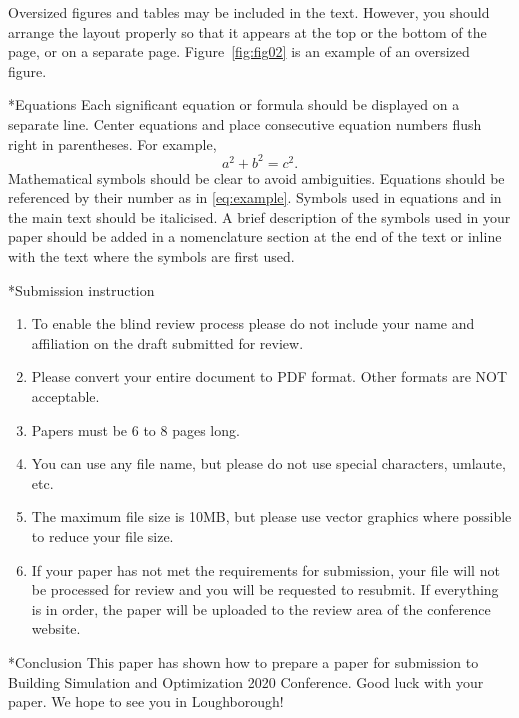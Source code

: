 \documentclass[twocolumn, a4paper,10pt]{article}
\makeatletter
\renewcommand\section{\@startsection{section}{1}{\z@}{0.25cm}{0.1cm}{\normalfont\large\bfseries}}
\renewcommand\subsection{\@startsection{subsection}{1}{\z@}{0.2cm}{0.1cm}{\normalfont\normalsize\bfseries}}
\makeatother
\begin{document}
Oversized figures and tables may be included in the text. However, you should arrange the layout properly so that it appears at the top or the bottom of the page, or on a separate page. Figure~\ref{fig:fig02} is an example of an oversized figure.

\subsection*{Equations}
Each significant equation or formula should be displayed on a separate line. Center equations and place consecutive equation numbers flush right in parentheses. For example,
\begin{equation}\label{eq:example}
  a^2+b^2=c^2.
\end{equation}
Mathematical symbols should be clear to avoid ambiguities. Equations should be referenced by their number as in \eqref{eq:example}.
Symbols used in equations and in the main text should be italicised.  A brief description of the symbols used in your paper should be added in a nomenclature section at the end of the text or inline with the text where
the symbols are first used.

\section*{Submission instruction}
\begin{enumerate}
    \item To enable the blind review process please do not
        include your name and affiliation on the draft
        submitted for review.
    \item Please convert your entire document to PDF format. Other formats are NOT acceptable.
    \item Papers must be 6 to 8 pages long.
    \item You can use any file name, but please do not use special characters, umlaute, etc.
    \item The maximum file size is 10MB, but please use vector graphics where possible to reduce your file size.
    \item If your paper has not met the requirements for submission, your file will not be processed for review and you will be requested to resubmit. If everything is in order, the paper will be uploaded to the review area of the conference website.
\end{enumerate}

\section*{Conclusion}
This paper has shown how to prepare a paper for submission to Building Simulation and Optimization 2020 Conference. Good luck with your paper. We hope to see you in Loughborough!
\end{document}
